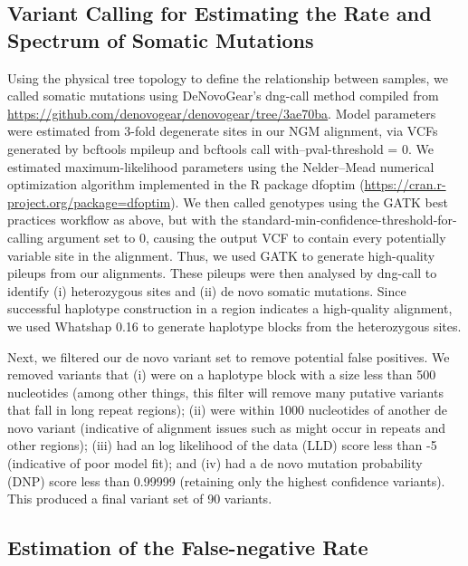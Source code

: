 \subsection{Variant Calling for Estimating the Rate and Spectrum of Somatic Mutations}

Using the physical tree topology to define the relationship between samples, we called somatic mutations using DeNovoGear's dng-call method \parencite{ramu_denovogear_2013} compiled from \url{https://github.com/denovogear/denovogear/tree/3ae70ba}. Mo\-del parameters were estimated from 3-fold degenerate sites in our NGM alignment, via VCFs generated by bcftools mpileup and bcftools call with--pval-threshold = 0. We estimated maximum-likelihood parameters using the Nelder–Mead numerical optimization algorithm implemented in the R package dfoptim (\url{https://cran.r-project.org/package=dfoptim}). We then called genotypes using the GATK best practices workflow as above, but with the standard-min-confidence-threshold-for-calling argument set to 0, causing the output VCF to contain every potentially variable site in the alignment. Thus, we used GATK to generate high-quality pileups from our alignments. These pileups were then analysed by dng-call to identify (i) heterozygous sites and (ii) de novo somatic mutations. Since successful haplotype construction in a region indicates a high-quality alignment, we used Whatshap 0.16 \parencite{martin_whatshap_2016} to generate haplotype blocks from the heterozygous sites.

Next, we filtered our de novo variant set to remove potential false positives. We removed variants that (i) were on a haplotype block with a size less than 500 nucleotides (among other things, this filter will remove many putative variants that fall in long repeat regions); (ii) were within 1000 nucleotides of another de novo variant (indicative of alignment issues such as might occur in repeats and other regions); (iii) had an log likelihood of the data (LLD) score less than -5 (indicative of poor model fit); and (iv) had a de novo mutation probability (DNP) score less than 0.99999 (retaining only the highest confidence variants). This produced a final variant set of 90 variants.

\subsection{Estimation of the False-negative Rate}

